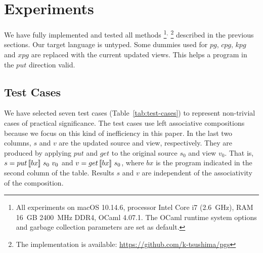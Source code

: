 \section{Experiments} \label{sect:experiments}

We have fully implemented and tested all methods%
%
\footnote{All experiments on macOS 10.14.6, processor Intel Core i7 (2.6~GHz), RAM 16~GB 2400~MHz DDR4, OCaml 4.07.1. The OCaml runtime system options and garbage collection parameters are set as default.}$^,$%
%
\footnote{The implementation is available: \url{https://github.com/k-tsushima/pgs}}
%
described in the previous sections. Our target language is untyped. Some dummies used for $pg$, $cpg$, $kpg$ and $xpg$ are replaced with the current updated views. This helps a program in the $put$ direction valid.

\subsection{Test Cases}

We have 
selected seven test cases (Table~\ref{tab:test-cases}) to 
represent
non-trivial cases of practical significance.
The test cases use
left associative compositions because we focus on this kind of inefficiency in this paper.
In the last two columns, $s$ and $v$ are the updated source and view, respectively. They are produced by applying $put$ and $get$ to the original source $s_0$ and view $v_0$. That is, $s = put \, [\![bx]\!] \ s_0 \ v_0$ and $v = get \, [\![bx]\!] \ s_0$, where $bx$ is the program indicated in the second column of the table. 
Results $s$ and $v$ are independent of the associativity 
of the composition.

